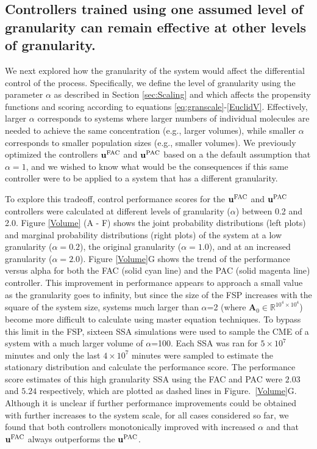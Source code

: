 \documentclass[12pt]{iopart}
\begin{document}
\subsection{Controllers trained using one assumed level of granularity can remain effective at other levels of granularity.}

We next explored how the granularity of the system would affect the differential control of the process. Specifically, we define the level of granularity using the parameter $\alpha$ as described in Section \ref{sec:Scaling} and which affects the propensity functions and scoring according to equations \ref{eq:granscale}-\ref{EuclidV}. Effectively, larger $\alpha$ corresponds to systems where larger numbers of individual molecules are needed to achieve the same concentration (e.g., larger volumes), while smaller $\alpha$ corresponds to smaller population sizes (e.g., smaller volumes). We previously optimized the controllers $\mathbf{u}^{\rm FAC}$ and $\mathbf{u}^{\rm PAC}$ based on a the default assumption that $\alpha=1$, and we wished to know what would be the consequences if this same controller were to be applied to a system that has a different granularity. 

To explore this tradeoff, control performance scores for the $\mathbf{u}^{\rm FAC}$ and $\mathbf{u}^{\rm PAC}$ controllers were calculated at different levels of granularity ($\alpha$) between 0.2 and 2.0.  Figure \ref{Volume} (A - F) shows the joint probability distributions (left plots) and marginal probability distributions (right plots) of the system at a low granularity ($\alpha=0.2$), the original granularity ($\alpha=1.0$), and at an increased granularity ($\alpha=2.0$). 
Figure \ref{Volume}G shows the trend of the performance versus alpha for both the FAC (solid cyan line) and the PAC (solid magenta line) controller.  This improvement in performance appears to approach a small value as the granularity goes to infinity, but since the size of the FSP increases with the square of the system size, systems much larger than $\alpha$=2 (where $\mathbf{A}_0\in \mathbb{R}^{10^4\times10^4}$) become more difficult to calculate using master equation techniques. To bypass this limit in the FSP, sixteen SSA simulations were used to sample the CME of a system with a much larger volume of $\alpha$=100. Each SSA was ran for $5\times10^7$ minutes and only the last $4\times10^7$ minutes were sampled to estimate the stationary distribution and calculate the performance score. The performance score estimates of this high granularity SSA using the FAC and PAC were $2.03$ and $5.24$ respectively, which are plotted as dashed lines in Figure.\ \ref{Volume}G. Although it is unclear if further performance improvements could be obtained with further increases to the system scale, for all cases considered so far, we found that both controllers monotonically improved with increased $\alpha$ and that $\mathbf{u}^{\rm FAC}$ always outperforms the $\mathbf{u}^{\rm PAC}$. 
\end{document}
